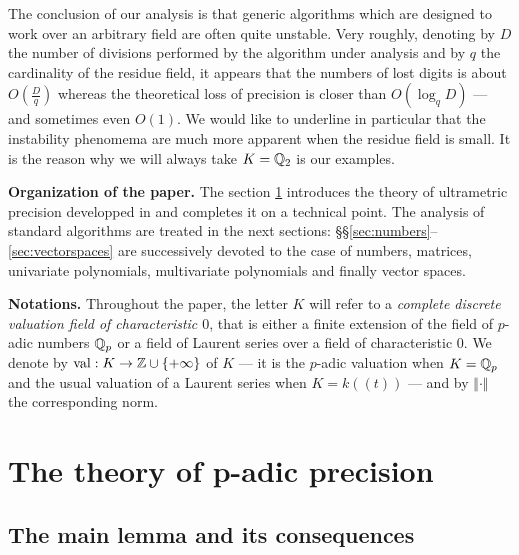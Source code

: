\documentclass{sig-alternate}
\DeclareMathOperator{\val}{val}
\begin{document}
The conclusion of our analysis is that generic algorithms which are 
designed to work over an arbitrary field are often quite unstable. Very 
roughly, denoting by $D$ the number of divisions performed by the 
algorithm under analysis and by $q$ the cardinality of the residue 
field, it appears that the numbers of lost digits is about $O(\frac D 
q)$ whereas the theoretical loss of precision is closer than $O(\log_q 
D)$ --- and sometimes even $O(1)$. We would like to underline in 
particular that the instability phenomema are much more apparent when 
the residue field is small. It is the reason why we will always take
$K = \mathbb Q_2$ is our examples.

\medskip

\noindent
{\bf Organization of the paper.}
The section \ref{sec:theory} introduces the theory of ultrametric 
precision developped in \cite{caruso-roe-vaccon:14a} and completes it on a technical 
point. The analysis of standard algorithms are treated in the next
sections: \S\S \ref{sec:numbers}--\ref{sec:vectorspaces} are 
successively devoted to the case of numbers, matrices, univariate 
polynomials, multivariate polynomials and finally vector spaces.

\medskip

\noindent
{\bf Notations.}
Throughout the paper, the letter $K$ will refer to a \emph{complete 
discrete valuation field of characteristic $0$}, that is either a finite 
extension of the field of $p$-adic numbers $\mathbb Q_p$ or a field of Laurent 
series over a field of characteristic $0$. We denote by $\val : K \to \Z 
\cup \{+\infty\}$ of $K$ --- it is the $p$-adic valuation when $K = \mathbb Q_p$ 
and the usual valuation of a Laurent series when $K = k((t))$ --- and by 
$\Vert \cdot \Vert$ the corresponding norm.

\section{The theory of p-adic precision}
\label{sec:theory}

\subsection{The main lemma and its consequences}

\end{document}
